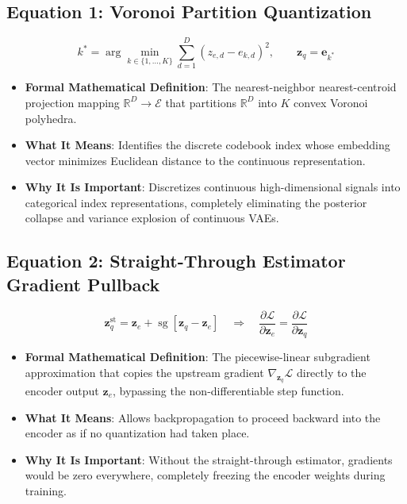 \documentclass[11pt,a4paper]{article}
\theoremstyle{definition}
\begin{document}
\subsection{\textbf{Equation 1: Voronoi Partition Quantization}}
{\boldmath
\begin{equation}
k^* = \arg\min_{k \in \{1, \dots, K\}} \sum_{d=1}^D (z_{e, d} - e_{k, d})^2, \qquad \mathbf{z}_q = \mathbf{e}_{k^*}
\end{equation}
}
\begin{itemize}
    \item \textbf{Formal Mathematical Definition}:
    The nearest-neighbor nearest-centroid projection mapping $\mathbb{R}^D \to \mathcal{E}$ that partitions $\mathbb{R}^D$ into $K$ convex Voronoi polyhedra.
    \item \textbf{What It Means}:
    Identifies the discrete codebook index whose embedding vector minimizes Euclidean distance to the continuous representation.
    \item \textbf{Why It Is Important}:
    Discretizes continuous high-dimensional signals into categorical index representations, completely eliminating the posterior collapse and variance explosion of continuous VAEs.
\end{itemize}

\subsection{\textbf{Equation 2: Straight-Through Estimator Gradient Pullback}}
{\boldmath
\begin{equation}
\mathbf{z}_q^{\text{st}} = \mathbf{z}_e + \operatorname{sg}[\mathbf{z}_q - \mathbf{z}_e] \quad \Longrightarrow \quad \frac{\partial \mathcal{L}}{\partial \mathbf{z}_e} = \frac{\partial \mathcal{L}}{\partial \mathbf{z}_q}
\end{equation}
}
\begin{itemize}
    \item \textbf{Formal Mathematical Definition}:
    The piecewise-linear subgradient approximation that copies the upstream gradient $\nabla_{\mathbf{z}_q} \mathcal{L}$ directly to the encoder output $\mathbf{z}_e$, bypassing the non-differentiable step function.
    \item \textbf{What It Means}:
    Allows backpropagation to proceed backward into the encoder as if no quantization had taken place.
    \item \textbf{Why It Is Important}:
    Without the straight-through estimator, gradients would be zero everywhere, completely freezing the encoder weights during training.
\end{itemize}
\end{document}
